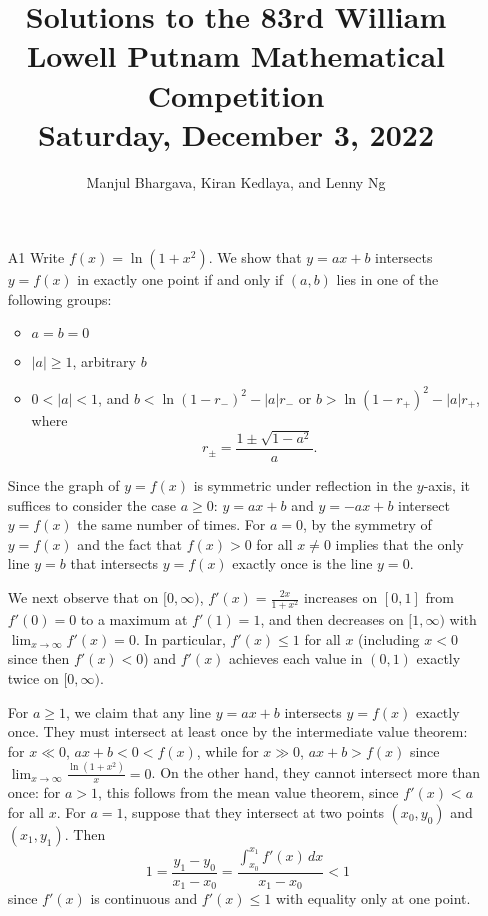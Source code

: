 \documentclass[amssymb,twocolumn,pra,10pt,aps]{revtex4-1}
\begin{document}
\title{Solutions to the 83rd William Lowell Putnam Mathematical Competition \\
    Saturday, December 3, 2022}
\author{Manjul Bhargava, Kiran Kedlaya, and Lenny Ng}
\noaffiliation
\maketitle

\begin{itemize}
\item[A1]
Write $f(x) = \ln(1+x^2)$.
We show that $y=ax+b$ intersects $y=f(x)$ in exactly one point if and only if $(a,b)$ lies in one of the following groups:
\begin{itemize}
\item
$a=b=0$
\item
$|a| \geq 1$, arbitrary $b$
\item
$0 < |a| < 1$, and $b<\ln(1-r_-)^2-|a|r_-$ or $b>\ln(1-r_+)^2-|a|r_+$, where 
\[
r_\pm = \frac{1\pm\sqrt{1-a^2}}{a}.
\]
\end{itemize}

 Since the graph of $y=f(x)$ is symmetric under reflection in the $y$-axis, it suffices to consider the case $a \geq 0$: $y=ax+b$ and $y=-ax+b$ intersect $y=f(x)$ the same number of times. For $a=0$, by the symmetry of $y=f(x)$ and the fact that $f(x)> 0$ for all $x\neq 0$ implies that the only line $y=b$ that intersects $y=f(x)$ exactly once is the line $y=0$.

We next observe that on $[0,\infty)$, $f'(x) = \frac{2x}{1+x^2}$ increases on $[0,1]$ from $f'(0)=0$ to a maximum at $f'(1)=1$, and then decreases on $[1,\infty)$ with $\lim_{x\to\infty} f'(x)=0$. In particular, $f'(x) \leq 1$ for all $x$ (including $x<0$ since then $f'(x)<0$) and $f'(x)$ achieves each value in $(0,1)$ exactly twice on $[0,\infty)$.

For $a \geq 1$, we claim that any line $y=ax+b$ intersects $y=f(x)$ exactly once. They must intersect at least once by the intermediate value theorem: for $x\ll 0$, $ax+b<0<f(x)$, while for $x \gg 0$, $ax+b>f(x)$ since $\lim_{x\to\infty} \frac{\ln(1+x^2)}{x} = 0$. On the other hand, they cannot intersect more than once: for $a>1$, this follows from the mean value theorem, since $f'(x)<a$ for all $x$. For $a=1$, suppose that they intersect at two points $(x_0,y_0)$ and $(x_1,y_1)$. Then
\[
1 = \frac{y_1-y_0}{x_1-x_0} = \frac{\int_{x_0}^{x_1} f'(x)\,dx}{x_1-x_0} < 1
\]
since $f'(x)$ is continuous and $f'(x) \leq 1$ with equality only at one point.


\end{itemize}
\end{document}
